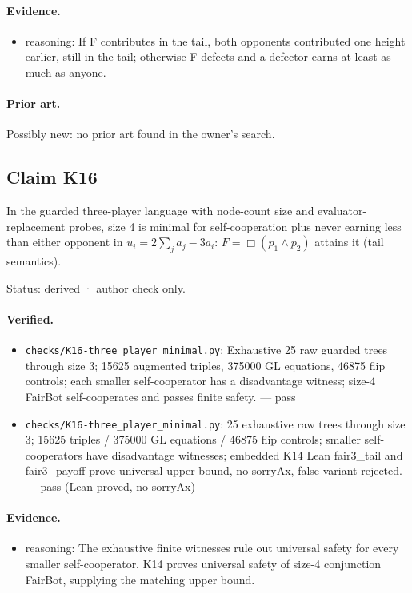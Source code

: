 \documentclass{article}
\begin{document}
\paragraph{Evidence.}
\begin{itemize}
\item reasoning: If F contributes in the tail, both opponents contributed one height earlier, still in the tail; otherwise F defects and a defector earns at least as much as anyone.
\end{itemize}

\paragraph{Prior art.} Possibly new: no prior art found in the owner's search.

\subsection*{Claim K16}

In the guarded three-player language with node-count size and evaluator-replacement probes, size 4 is minimal for self-cooperation plus never earning less than either opponent in $u_i=2\sum_j a_j-3a_i$: $F=\Box(p_1\land p_2)$ attains it (tail semantics).

Status: derived · author check only.

\paragraph{Verified.}
\begin{itemize}
\item \texttt{checks/K16-three\_player\_minimal.py}: Exhaustive 25 raw guarded trees through size 3; 15625 augmented triples, 375000 GL equations, 46875 flip controls; each smaller self-cooperator has a disadvantage witness; size-4 FairBot self-cooperates and passes finite safety. --- pass
\item \texttt{checks/K16-three\_player\_minimal.py}: 25 exhaustive raw trees through size 3; 15625 triples / 375000 GL equations / 46875 flip controls; smaller self-cooperators have disadvantage witnesses; embedded K14 Lean fair3\_tail and fair3\_payoff prove universal upper bound, no sorryAx, false variant rejected. --- pass (Lean-proved, no sorryAx)
\end{itemize}

\paragraph{Evidence.}
\begin{itemize}
\item reasoning: The exhaustive finite witnesses rule out universal safety for every smaller self-cooperator. K14 proves universal safety of size-4 conjunction FairBot, supplying the matching upper bound.
\end{itemize}
\end{document}
